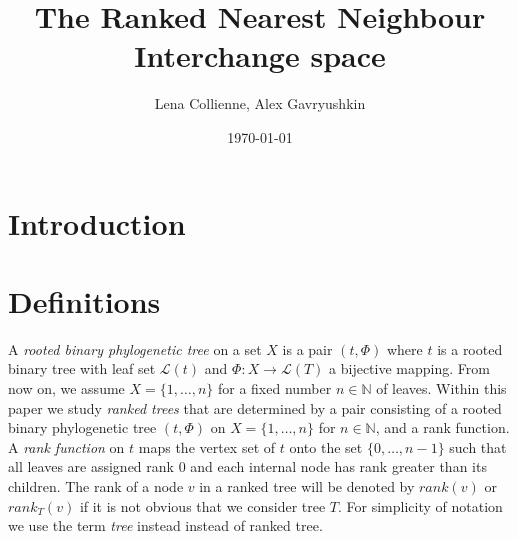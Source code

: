 \documentclass[11pt, a4paper]{article}
\title{The Ranked Nearest Neighbour Interchange space}
\date{\today}
\author{Lena Collienne, Alex Gavryushkin}
\begin{document}
\maketitle

\begin{abstract}

\end{abstract}


\section{Introduction}



\section{Definitions}


A \emph{rooted binary phylogenetic tree} on a set $X$ is a pair $(t, \Phi)$ where $t$ is a rooted binary tree with leaf set $\mathcal{L}(t)$ and $\Phi:X \to \mathcal{L}(T)$ a bijective mapping. 
From now on, we assume $X = \{1,\ldots,n\}$ for a fixed number $n \in \mathbb N$ of leaves.
Within this paper we study \emph{ranked trees} that are determined by a pair consisting of a rooted binary phylogenetic tree $(t, \Phi)$ on $X = \{1, \ldots, n\}$ for $n \in \mathbb N$, and a rank function.
A \emph{rank function} on $t$ maps the vertex set of $t$ onto the set $\{0,\ldots,n-1\}$ such that all leaves are assigned rank $0$ and each internal node has rank greater than its children.
The rank of a node $v$ in a ranked tree will be denoted by $rank(v)$ or $rank_T(v)$ if it is not obvious that we consider tree $T$.
For simplicity of notation we use the term \emph{tree} instead instead of ranked tree.
\end{document}
